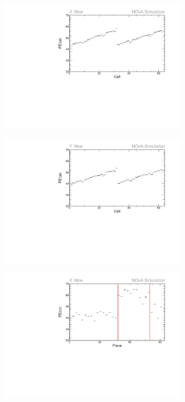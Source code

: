 \begin{figure}[h]
\begin{subfigure}[b]{0.495\textwidth}
\includegraphics[width=\textwidth]{Plots/TBCalibration/Attenprofs_Simulation_CellPE_X_Prof.pdf}
\end{subfigure}
\begin{subfigure}[b]{0.495\textwidth}
\centering
\includegraphics[width=\textwidth]{Plots/TBCalibration/Attenprofs_Simulation_CellPE_Y_Prof.pdf}
\end{subfigure}
\begin{subfigure}[b]{0.495\textwidth}
\centering
\includegraphics[width=\textwidth]{Plots/TBCalibration/Attenprofs_Simulation_PlanePE_X_Prof.pdf}

\end{subfigure}
\end{figure}
